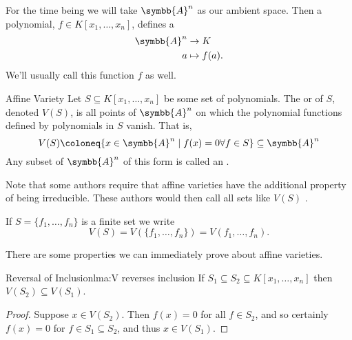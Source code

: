 \documentclass[fleqn]{NotesClass}
\newcommand{\affine}{\symbb{A}}
\begin{document}
    For the time being we will take \(\affine^n\) as our ambient space.
    Then a polynomial, \(f \in K[x_1, \dotsc, x_n]\), defines a 
    \begin{align}
        \affine^n &\to K\\
        a &\mapsto f(a).
    \end{align}
    We'll usually call this function \(f\) as well.
    
    \begin{dfn}{Affine Variety}{}
        Let \(S \subseteq K[x_1, \dotsc, x_n]\) be some set of polynomials.
        The  or  of \(S\), denoted \(V(S)\), is all points of \(\affine^n\) on which the polynomial functions defined by polynomials in \(S\) vanish.
        That is,
        \begin{equation}
            V(S) \coloneq \{x \in \affine^n \mid f(x) = 0 \forall f \in S\} \subseteq \affine^n
        \end{equation}
        Any subset of \(\affine^n\) of this form is called an .
    \end{dfn}
    
    \begin{wrn}
        Note that some authors require that affine varieties have the additional property of being irreducible.
        These authors would then call all sets like \(V(S)\) .
    \end{wrn}
    
    \begin{ntn}{}{}
        If \(S = \{f_1, \dotsc, f_n\}\) is a finite set we write
        \begin{equation}
            V(S) = V(\{f_1, \dotsc, f_n\}) = V(f_1, \dotsc, f_n).
        \end{equation}
    \end{ntn}
    
    There are some properties we can immediately prove about affine varieties.
    
    \begin{lma}{Reversal of Inclusion}{lma:V reverses inclusion}
        If \(S_1 \subseteq S_2 \subseteq K[x_1, \dotsc, x_n]\) then \(V(S_2) \subseteq V(S_1)\).
        \begin{proof}
            Suppose \(x \in V(S_2)\).
            Then \(f(x) = 0\) for all \(f \in S_2\), and so certainly \(f(x) = 0\) for \(f \in S_1 \subseteq S_2\), and thus \(x \in V(S_1)\).
        \end{proof}
    \end{lma}
    
\end{document}
